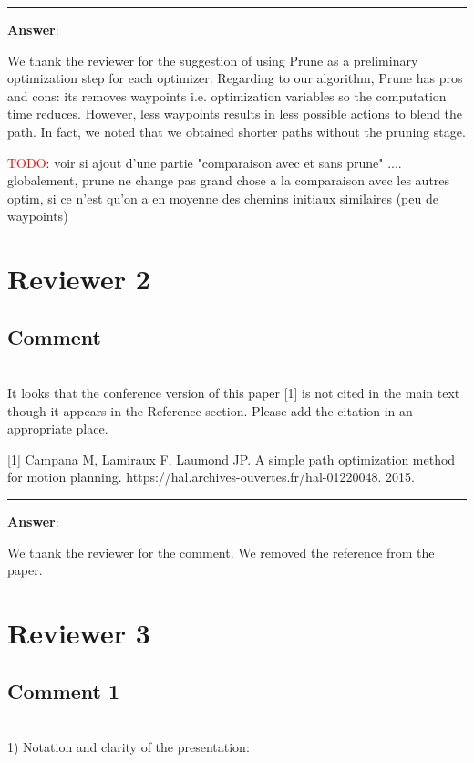 \documentclass{scrartcl}
\newcommand{\todo}{\textcolor{red}{TODO}}
\begin{document}
\rule{\linewidth}{.1pt}
\textbf{Answer}:

We thank the reviewer for the suggestion of using Prune as a preliminary optimization step for each optimizer. Regarding to our algorithm, Prune has pros and cons: its removes waypoints i.e. optimization variables so the computation time reduces. However, less waypoints results in less possible actions to blend the path. In fact, we noted that we obtained shorter paths without the pruning stage.

\todo : voir si ajout d'une partie "comparaison avec et sans prune" .... globalement, prune ne change pas grand chose a la comparaison avec les autres optim, si ce n'est qu'on a en moyenne des chemins initiaux similaires (peu de waypoints)


\section{Reviewer 2}

\subsection{Comment}
\hrulefill\\


It looks that the conference version of this paper [1] is not cited in the main text though it appears in the Reference section.  Please add the citation in an appropriate place.

[1] Campana M, Lamiraux F, Laumond JP. A simple path optimization method for 
motion planning. https://hal.archives-ouvertes.fr/hal-01220048. 2015.

\rule{\linewidth}{.1pt}
\textbf{Answer}:

We thank the reviewer for the comment. We removed the reference from the paper.


\section{Reviewer 3}

\subsection{Comment 1}
\hrulefill\\

1) Notation and clarity of the presentation:
\end{document}
